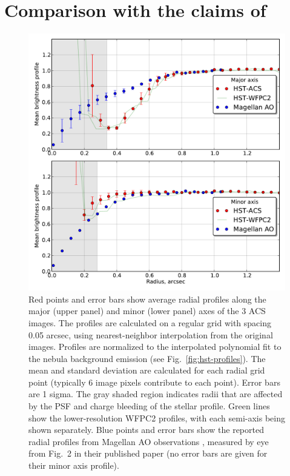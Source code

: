 \documentclass[oneside, 11pt]{article}
\begin{document}
\section{Comparison with the claims of \citeauthor{Follette:2013a}}
\label{sec:comp}

\begin{figure}
  \centering
  \includegraphics[width=\linewidth]{rprofiles-acs-218-354}
  \caption{Red points and error bars show average radial profiles along the major (upper panel) and minor (lower panel) axes of the 3 ACS images.  The profiles  are calculated on a regular grid with spacing 0.05 arcsec, using nearest-neighbor interpolation from the original images.    Profiles are normalized to the interpolated polynomial fit to the nebula background emission (see Fig.~\ref{fig:hst-profiles}).  The mean and standard deviation are calculated for each radial grid point (typically 6 image pixels contribute to each point).   Error bars are 1 sigma.   The gray shaded region indicates radii that are affected by the PSF and charge bleeding of the stellar profile.   Green lines show the lower-resolution WFPC2 profiles, with each semi-axis being shown separately.   Blue points and error bars show the reported radial profiles from Magellan AO observations \citep{Follette:2013a}, measured by eye from Fig.~2 in their published paper (no error bars are given for their minor axis profile).}

  \label{fig:compare}
\end{figure}
\end{document}
